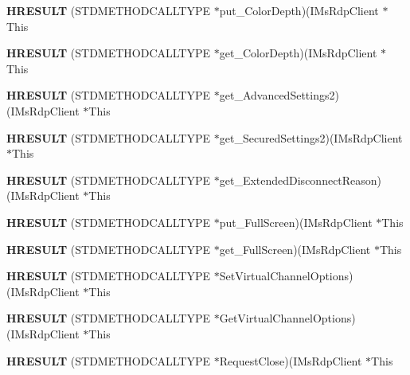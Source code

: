 \begin{DoxyCompactItemize}
{\bfseries H\+R\+E\+S\+U\+LT} (S\+T\+D\+M\+E\+T\+H\+O\+D\+C\+A\+L\+L\+T\+Y\+PE $\ast$put\+\_\+\+Color\+Depth)(I\+Ms\+Rdp\+Client $\ast$This
\item 
\mbox{\label{struct_i_ms_rdp_client_vtbl_a13906c5d3dc5bbb581ac394c53a0407b}} 
{\bfseries H\+R\+E\+S\+U\+LT} (S\+T\+D\+M\+E\+T\+H\+O\+D\+C\+A\+L\+L\+T\+Y\+PE $\ast$get\+\_\+\+Color\+Depth)(I\+Ms\+Rdp\+Client $\ast$This
\item 
\mbox{\label{struct_i_ms_rdp_client_vtbl_a919d4b4cc0c474ce049a24e4a75203e4}} 
{\bfseries H\+R\+E\+S\+U\+LT} (S\+T\+D\+M\+E\+T\+H\+O\+D\+C\+A\+L\+L\+T\+Y\+PE $\ast$get\+\_\+\+Advanced\+Settings2)(I\+Ms\+Rdp\+Client $\ast$This
\item 
\mbox{\label{struct_i_ms_rdp_client_vtbl_a79d99d44b5686a9288216761e0952279}} 
{\bfseries H\+R\+E\+S\+U\+LT} (S\+T\+D\+M\+E\+T\+H\+O\+D\+C\+A\+L\+L\+T\+Y\+PE $\ast$get\+\_\+\+Secured\+Settings2)(I\+Ms\+Rdp\+Client $\ast$This
\item 
\mbox{\label{struct_i_ms_rdp_client_vtbl_ae701b12d0d12a147d997a3029dddd8bb}} 
{\bfseries H\+R\+E\+S\+U\+LT} (S\+T\+D\+M\+E\+T\+H\+O\+D\+C\+A\+L\+L\+T\+Y\+PE $\ast$get\+\_\+\+Extended\+Disconnect\+Reason)(I\+Ms\+Rdp\+Client $\ast$This
\item 
\mbox{\label{struct_i_ms_rdp_client_vtbl_ad087891ba187eed1d70052decda696a6}} 
{\bfseries H\+R\+E\+S\+U\+LT} (S\+T\+D\+M\+E\+T\+H\+O\+D\+C\+A\+L\+L\+T\+Y\+PE $\ast$put\+\_\+\+Full\+Screen)(I\+Ms\+Rdp\+Client $\ast$This
\item 
\mbox{\label{struct_i_ms_rdp_client_vtbl_a8782773be21faa448f4f0abc306c54f5}} 
{\bfseries H\+R\+E\+S\+U\+LT} (S\+T\+D\+M\+E\+T\+H\+O\+D\+C\+A\+L\+L\+T\+Y\+PE $\ast$get\+\_\+\+Full\+Screen)(I\+Ms\+Rdp\+Client $\ast$This
\item 
\mbox{\label{struct_i_ms_rdp_client_vtbl_a1a1a8c0894f4c5586dbc6fb12e3b1ef9}} 
{\bfseries H\+R\+E\+S\+U\+LT} (S\+T\+D\+M\+E\+T\+H\+O\+D\+C\+A\+L\+L\+T\+Y\+PE $\ast$Set\+Virtual\+Channel\+Options)(I\+Ms\+Rdp\+Client $\ast$This
\item 
\mbox{\label{struct_i_ms_rdp_client_vtbl_af097637a3a379026ecf05ccd1b99b9b3}} 
{\bfseries H\+R\+E\+S\+U\+LT} (S\+T\+D\+M\+E\+T\+H\+O\+D\+C\+A\+L\+L\+T\+Y\+PE $\ast$Get\+Virtual\+Channel\+Options)(I\+Ms\+Rdp\+Client $\ast$This
\item 
\mbox{\label{struct_i_ms_rdp_client_vtbl_a9d69f4bf407303cc9870abbc32908667}} 
{\bfseries H\+R\+E\+S\+U\+LT} (S\+T\+D\+M\+E\+T\+H\+O\+D\+C\+A\+L\+L\+T\+Y\+PE $\ast$Request\+Close)(I\+Ms\+Rdp\+Client $\ast$This
\end{DoxyCompactItemize}
